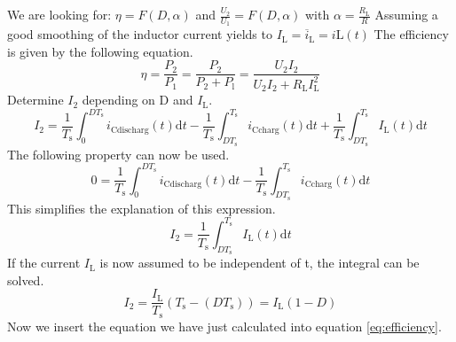 \begin{solutionblock}
We are looking for: $\eta= F(D,\alpha)$ and $\frac{U_\mathrm{2}}{U_\mathrm{1}}=F(D,\alpha)$ with $\alpha=\frac{R_\mathrm{L}}{R}$
Assuming a good smoothing of the inductor current yields to $I_\mathrm{L}=\overline i_\mathrm{L}=i\mathrm{L}(t)$
The efficiency is given by the following equation.
\begin{equation}
    \eta = \frac{P_\mathrm{2}}{P_\mathrm{1}} = \frac{P_\mathrm{2}}{P_\mathrm{2}+P_\mathrm{l}} = \frac{U_\mathrm{2} I_\mathrm{2}}{U_\mathrm{2} I_\mathrm{2} +R_\mathrm{L} I_\mathrm{L}^2} \label{eq:efficiency}
\end{equation}
Determine $I_\mathrm{2}$ depending on D and $I_\mathrm{L}$.
\begin{equation}
    I_\mathrm{2}=\frac{1}{T_\mathrm{s}} \int_{0}^{DT_\mathrm{s}} i_\mathrm{C discharg}(t)\mathrm{d}t-\frac{1}{T_\mathrm{s}} \int_{DT_\mathrm{s}}^{T_\mathrm{s}} i_\mathrm{C charg}(t)\mathrm{d}t+\frac{1}{T_\mathrm{s}} \int_{DT_\mathrm{s}}^{T_\mathrm{s}} I_\mathrm{L}(t)\mathrm{d}t
\end{equation}
The following property can now be used.
\begin{equation}
    0 = \frac{1}{T_\mathrm{s}} \int_{0}^{DT_\mathrm{s}} i_\mathrm{C discharg}(t)\mathrm{d}t-\frac{1}{T_\mathrm{s}} \int_{DT_\mathrm{s}}^{T_\mathrm{s}} i_\mathrm{C charg}(t)\mathrm{d}t
\end{equation}
This simplifies the explanation of this expression.
\begin{equation}
    I_\mathrm{2}= \frac{1}{T_\mathrm{s}} \int_{DT_\mathrm{s}}^{T_\mathrm{s}} I_\mathrm{L}(t)\mathrm{d}t
\end{equation}
If the current $I_\mathrm{L}$ is now assumed to be independent of t, the integral can be solved.
\begin{equation}
    I_\mathrm{2}= \frac{I_\mathrm{L}}{T_\mathrm{s}}(T_\mathrm{s}-(DT_\mathrm{s}))=I_\mathrm{L}(1-D)
\end{equation}
Now we insert the equation we have just calculated into equation \eqref{eq:efficiency}.
\begin{equation}

\end{equation}
\end{solutionblock}
